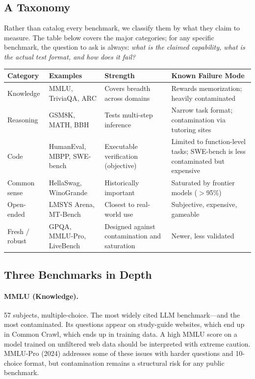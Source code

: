 \subsection{A Taxonomy}

Rather than catalog every benchmark, we classify them by what they claim to measure. The table below covers the major categories; for any specific benchmark, the question to ask is always: \emph{what is the claimed capability, what is the actual test format, and how does it fail?}

\begin{center}
\begin{tabularx}{\textwidth}{@{}p{2.3cm}p{3.2cm}X p{3.5cm}@{}}
\toprule
\textbf{Category} & \textbf{Examples} & \textbf{Strength} & \textbf{Known Failure Mode} \\
\midrule
Knowledge & MMLU, TriviaQA, ARC & Covers breadth across domains & Rewards memorization; heavily contaminated \\
Reasoning & GSM8K, MATH, BBH & Tests multi-step inference & Narrow task format; contamination via tutoring sites \\
Code & HumanEval, MBPP, SWE-bench & Executable verification (objective) & Limited to function-level tasks; SWE-bench is less contaminated but expensive \\
Common sense & HellaSwag, WinoGrande & Historically important & Saturated by frontier models ($>$95\%) \\
Open-ended & LMSYS Arena, MT-Bench & Closest to real-world use & Subjective, expensive, gameable \\
Fresh / robust & GPQA, MMLU-Pro, LiveBench & Designed against contamination and saturation & Newer, less validated \\
\bottomrule
\end{tabularx}
\end{center}

\subsection{Three Benchmarks in Depth}

\paragraph{MMLU (Knowledge).} 57 subjects, multiple-choice. The most widely cited LLM benchmark---and the most contaminated. Its questions appear on study-guide websites, which end up in Common Crawl, which ends up in training data. A high MMLU score on a model trained on unfiltered web data should be interpreted with extreme caution. MMLU-Pro (2024) addresses some of these issues with harder questions and 10-choice format, but contamination remains a structural risk for any public benchmark.

